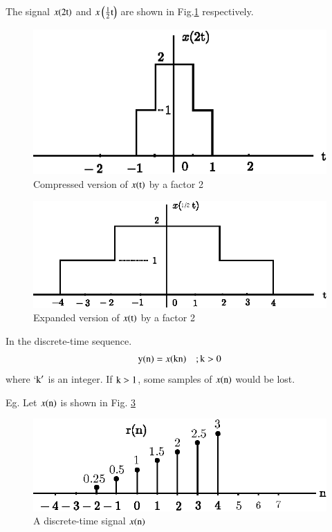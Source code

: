 \begin{itemize}
The signal $x(2 \textrm{t})$ and $x\left(\frac{1}{2}\textrm{t}\right)$ are shown in Fig.\ref{chap1-fig-1.21} respectively.
\begin{figure}[H]
\centering
\includegraphics{src/chap1/fig.1.21.eps}
\caption{Compressed version of $x(\textrm{t})$ by a factor 2}\label{chap1-fig-1.21}
\end{figure}
\begin{figure}[H]
\centering
\includegraphics{src/chap1/fig.1.22.eps}
\caption{Expanded version of $x(\textrm{t})$ by a factor 2}\label{chap1-fig-1.22}
\end{figure}

In the discrete-time sequence.
\begin{equation}
{\textrm{y}}{(\textrm{n})}= x{(\textrm{k}\textrm{n})} \quad ; \textrm{k} > 0\label{chap1-eq-1.35}
\end{equation}
where `$\textrm{k}'$ is an integer. If $\textrm{k}>1$, some samples of $x(\textrm{n})$ would be lost.

Eg. Let $x(\textrm{n})$ is shown in Fig. \ref{chap1-fig-1.23}
\begin{figure}[H]
\centering
\includegraphics{src/chap1/fig.1.23.eps}
\caption{A discrete-time signal $x(\textrm{n})$}\label{chap1-fig-1.23}
\end{figure}


\end{itemize}

